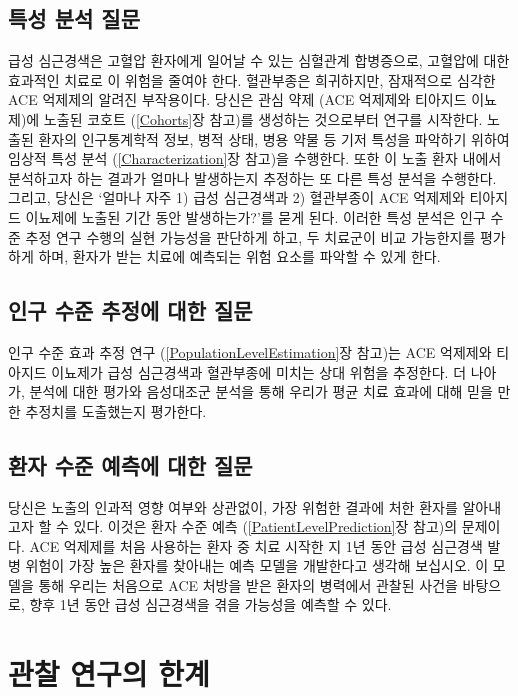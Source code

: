 \documentclass[10.5pt]{book}
\theoremstyle{definition}
\theoremstyle{definition}
\theoremstyle{definition}
\theoremstyle{remark}
\begin{document}
\subsection{특성 분석 질문}\label{--}

급성 심근경색은 고혈압 환자에게 일어날 수 있는 심혈관계 합병증으로,
고혈압에 대한 효과적인 치료로 이 위험을 줄여야 한다. 혈관부종은
희귀하지만, 잠재적으로 심각한 ACE 억제제의 알려진 부작용이다. 당신은
관심 약제 (ACE 억제제와 티아지드 이뇨제)에 노출된 코호트
(\ref{Cohorts}장 참고)를 생성하는 것으로부터 연구를 시작한다. 노출된
환자의 인구통계학적 정보, 병적 상태, 병용 약물 등 기저 특성을 파악하기
위하여 임상적 특성 분석 (\ref{Characterization}장 참고)을 수행한다. 또한
이 노출 환자 내에서 분석하고자 하는 결과가 얼마나 발생하는지 추정하는 또
다른 특성 분석을 수행한다. 그리고, 당신은 `얼마나 자주 1) 급성
심근경색과 2) 혈관부종이 ACE 억제제와 티아지드 이뇨제에 노출된 기간 동안
발생하는가?'를 묻게 된다. 이러한 특성 분석은 인구 수준 추정 연구 수행의
실현 가능성을 판단하게 하고, 두 치료군이 비교 가능한지를 평가하게 하며,
환자가 받는 치료에 예측되는 위험 요소를 파악할 수 있게 한다.

\subsection{인구 수준 추정에 대한 질문}\label{----}

인구 수준 효과 추정 연구 (\ref{PopulationLevelEstimation}장 참고)는 ACE
억제제와 티아지드 이뇨제가 급성 심근경색과 혈관부종에 미치는 상대 위험을
추정한다. 더 나아가, 분석에 대한 평가와 음성대조군 분석을 통해 우리가
평균 치료 효과에 대해 믿을 만한 추정치를 도출했는지 평가한다.

\subsection{환자 수준 예측에 대한 질문}\label{----}

당신은 노출의 인과적 영향 여부와 상관없이, 가장 위험한 결과에 처한
환자를 알아내고자 할 수 있다. 이것은 환자 수준 예측
(\ref{PatientLevelPrediction}장 참고)의 문제이다. ACE 억제제를 처음
사용하는 환자 중 치료 시작한 지 1년 동안 급성 심근경색 발병 위험이 가장
높은 환자를 찾아내는 예측 모델을 개발한다고 생각해 보십시오. 이 모델을
통해 우리는 처음으로 ACE 처방을 받은 환자의 병력에서 관찰된 사건을
바탕으로, 향후 1년 동안 급성 심근경색을 겪을 가능성을 예측할 수 있다.

\section{관찰 연구의 한계}\label{--}
\end{document}
